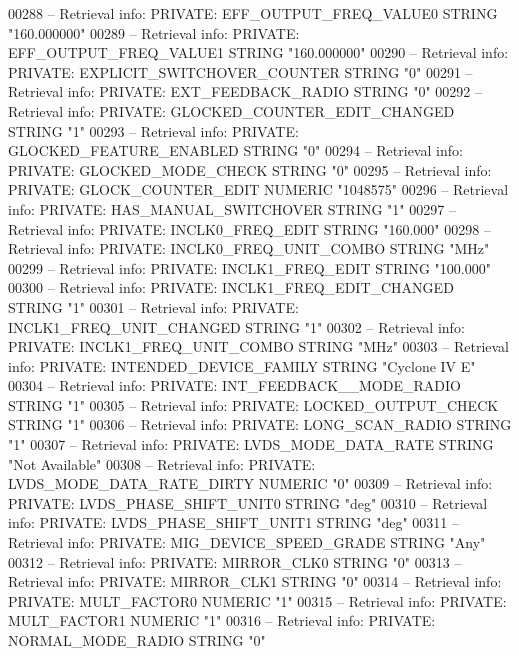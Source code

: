 \begin{DoxyCode}
{00288 \textcolor{keyword}{-- Retrieval info: PRIVATE: EFF\_OUTPUT\_FREQ\_VALUE0 STRING "160.000000"}
00289 \textcolor{keyword}{-- Retrieval info: PRIVATE: EFF\_OUTPUT\_FREQ\_VALUE1 STRING "160.000000"}
00290 \textcolor{keyword}{-- Retrieval info: PRIVATE: EXPLICIT\_SWITCHOVER\_COUNTER STRING "0"}
00291 \textcolor{keyword}{-- Retrieval info: PRIVATE: EXT\_FEEDBACK\_RADIO STRING "0"}
00292 \textcolor{keyword}{-- Retrieval info: PRIVATE: GLOCKED\_COUNTER\_EDIT\_CHANGED STRING "1"}
00293 \textcolor{keyword}{-- Retrieval info: PRIVATE: GLOCKED\_FEATURE\_ENABLED STRING "0"}
00294 \textcolor{keyword}{-- Retrieval info: PRIVATE: GLOCKED\_MODE\_CHECK STRING "0"}
00295 \textcolor{keyword}{-- Retrieval info: PRIVATE: GLOCK\_COUNTER\_EDIT NUMERIC "1048575"}
00296 \textcolor{keyword}{-- Retrieval info: PRIVATE: HAS\_MANUAL\_SWITCHOVER STRING "1"}
00297 \textcolor{keyword}{-- Retrieval info: PRIVATE: INCLK0\_FREQ\_EDIT STRING "160.000"}
00298 \textcolor{keyword}{-- Retrieval info: PRIVATE: INCLK0\_FREQ\_UNIT\_COMBO STRING "MHz"}
00299 \textcolor{keyword}{-- Retrieval info: PRIVATE: INCLK1\_FREQ\_EDIT STRING "100.000"}
00300 \textcolor{keyword}{-- Retrieval info: PRIVATE: INCLK1\_FREQ\_EDIT\_CHANGED STRING "1"}
00301 \textcolor{keyword}{-- Retrieval info: PRIVATE: INCLK1\_FREQ\_UNIT\_CHANGED STRING "1"}
00302 \textcolor{keyword}{-- Retrieval info: PRIVATE: INCLK1\_FREQ\_UNIT\_COMBO STRING "MHz"}
00303 \textcolor{keyword}{-- Retrieval info: PRIVATE: INTENDED\_DEVICE\_FAMILY STRING "Cyclone IV E"}
00304 \textcolor{keyword}{-- Retrieval info: PRIVATE: INT\_FEEDBACK\_\_MODE\_RADIO STRING "1"}
00305 \textcolor{keyword}{-- Retrieval info: PRIVATE: LOCKED\_OUTPUT\_CHECK STRING "1"}
00306 \textcolor{keyword}{-- Retrieval info: PRIVATE: LONG\_SCAN\_RADIO STRING "1"}
00307 \textcolor{keyword}{-- Retrieval info: PRIVATE: LVDS\_MODE\_DATA\_RATE STRING "Not Available"}
00308 \textcolor{keyword}{-- Retrieval info: PRIVATE: LVDS\_MODE\_DATA\_RATE\_DIRTY NUMERIC "0"}
00309 \textcolor{keyword}{-- Retrieval info: PRIVATE: LVDS\_PHASE\_SHIFT\_UNIT0 STRING "deg"}
00310 \textcolor{keyword}{-- Retrieval info: PRIVATE: LVDS\_PHASE\_SHIFT\_UNIT1 STRING "deg"}
00311 \textcolor{keyword}{-- Retrieval info: PRIVATE: MIG\_DEVICE\_SPEED\_GRADE STRING "Any"}
00312 \textcolor{keyword}{-- Retrieval info: PRIVATE: MIRROR\_CLK0 STRING "0"}
00313 \textcolor{keyword}{-- Retrieval info: PRIVATE: MIRROR\_CLK1 STRING "0"}
00314 \textcolor{keyword}{-- Retrieval info: PRIVATE: MULT\_FACTOR0 NUMERIC "1"}
00315 \textcolor{keyword}{-- Retrieval info: PRIVATE: MULT\_FACTOR1 NUMERIC "1"}
00316 \textcolor{keyword}{-- Retrieval info: PRIVATE: NORMAL\_MODE\_RADIO STRING "0"}
}
\end{DoxyCode}
